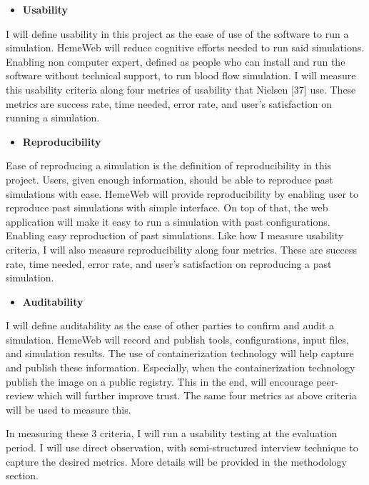 \documentclass[]{article}
\providecommand{\tightlist}{%
  \setlength{\itemsep}{0pt}\setlength{\parskip}{0pt}}
\begin{document}
\begin{itemize}
\tightlist
\item
  \textbf{Usability}
\end{itemize}

I will define usability in this project as the ease of use of the
software to run a simulation. HemeWeb will reduce cognitive efforts
needed to run said simulations. Enabling non computer expert, defined as
people who can install and run the software without technical support,
to run blood flow simulation. I will measure this usability criteria
along four metrics of usability that Nielsen {[}37{]} use. These metrics
are success rate, time needed, error rate, and user's satisfaction on
running a simulation.

\begin{itemize}
\tightlist
\item
  \textbf{Reproducibility}
\end{itemize}

Ease of reproducing a simulation is the definition of reproducibility in
this project. Users, given enough information, should be able to
reproduce past simulations with ease. HemeWeb will provide
reproducibility by enabling user to reproduce past simulations with
simple interface. On top of that, the web application will make it easy
to run a simulation with past configurations. Enabling easy reproduction
of past simulations. Like how I measure usability criteria, I will also
measure reproducibility along four metrics. These are success rate, time
needed, error rate, and user's satisfaction on reproducing a past
simulation.

\begin{itemize}
\tightlist
\item
  \textbf{Auditability}
\end{itemize}

I will define auditability as the ease of other parties to confirm and
audit a simulation. HemeWeb will record and publish tools,
configurations, input files, and simulation results. The use of
containerization technology will help capture and publish these
information. Especially, when the containerization technology publish
the image on a public registry. This in the end, will encourage
peer-review which will further improve trust. The same four metrics as
above criteria will be used to measure this.

In measuring these 3 criteria, I will run a usability testing at the
evaluation period. I will use direct observation, with semi-structured
interview technique to capture the desired metrics. More details will be
provided in the methodology section.
\end{document}
